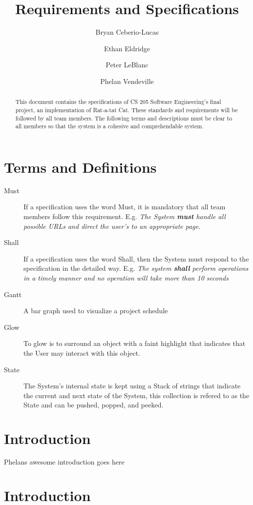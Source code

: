 \documentclass[12pt]{IEEEtran}
\title{Requirements and Specifications}
\author{Bryan Ceberio-Lucas \and Ethan Eldridge \and Peter LeBlanc \and Phelan Vendeville }
\begin{document}
\maketitle

\begin{abstract}
	This document contains the specifications of CS 205 Software  Engineering's final project, an implementation of Rat-a-tat Cat. These standards and requirements will be followed by all team members. The 			following terms and descriptions must be clear to all members so that the system is a cohesive and comprehendable system.
\end{abstract}

\tableofcontents

\section{Terms and Definitions}
\label{sec:TermsDefinitions}
	\begin{description}
		\item[Must] If a specification uses the word Must, it is mandatory that all team members follow this requirement. E.g.  \textit{The System \textbf{must} handle all possible URLs and direct the user's to an 				appropriate page.} 
		\item[Shall] If a specification uses the word Shall, then the System must respond to the specification in the detailed way. E.g. \textit{The system \textbf{shall} perform operations in a timely manner and 				no operation will take more than 10 seconds}
		\item[Gantt] A bar graph used to visualize a project schedule
		\item[Glow] To glow is to surround an object with a faint highlight that indicates that the User may interact with this object.
		\item[State] The System's internal state is kept using a Stack of strings that indicate the current and next state of the System, this collection is refered to as the State and can be pushed, popped, and 				peeked.
	\end{description}

\section{Introduction}

	Phelans awesome introduction goes here

\section{Introduction}
\label{sec:introduction}
\end{document}
